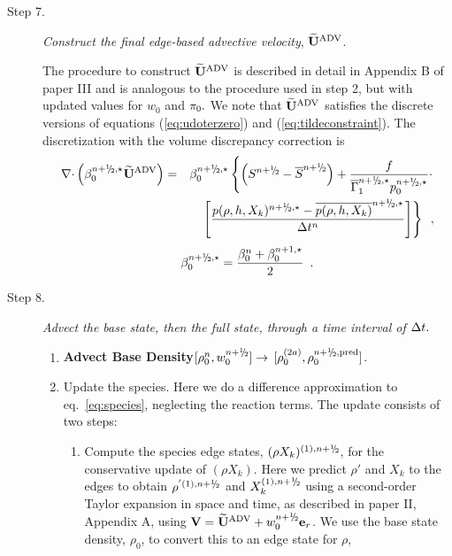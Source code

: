 \begin{description}
\begin{enumerate}
\end{enumerate}

\item[Step 7.] {\em Construct the final edge-based advective velocity}, $\widetilde{\mathbf{U}}^{\mathrm{ADV}}$.

The procedure to construct $\widetilde{\mathbf{U}}^{\mathrm{ADV}}$ is described in detail in Appendix B of paper III
and is analogous to the procedure used in step 2, but with updated values
for $w_0$ and $\pi_0.$  We note that $\widetilde{\mathbf{U}}^{\mathrm{ADV}}$ satisfies the discrete versions of 
equations (\ref{eq:udoterzero}) and (\ref{eq:tildeconstraint}).   The discretization
with the volume discrepancy correction is
\begin{eqnarray}
\nablab \cdotb \left(\beta_0^{\nph,\star} \uadvtwo\right) &=&
\beta_0^{\nph,\star}\left\{\left(S^{\nph} - \overline{S}^{\nph}\right)
 + \frac{f}{\gammabar^{\nph,\star} p_0^{\nph,\star}}\cdot \right. \nonumber \\
&& \left.\left[\frac{p(\rho,h,X_k)^{\nph,\star} - \overline{p(\rho,h,X_k)}^{\nph,\star}}{\Delta t^n}\right]\right\} \enskip ,
\end{eqnarray}
\begin{equation}
\beta_0^{\nph,\star} = \frac{ \beta_0^n +  \beta_0^{n+1,\star} }{2} \enskip .
\end{equation}

\item[Step 8.] {\em Advect the base state, then the full state, through a time interval of $\Delta t.$}

\begin{enumerate}
\renewcommand{\theenumi}{{\bf \alph{enumi}}}

\item {\bf Advect Base Density}$[\rho_0^{n},w_0^{\nph}] \rightarrow$ 
$[\rho_0^{(2a)}, \rho_0^{\nph,{\rm pred}}]$.

\item Update the species.  Here we do a difference approximation to
  eq.~\ref{eq:species}, neglecting the reaction terms.  The
  update consists of two steps:

  \begin{enumerate}
  \renewcommand{\labelenumii}{{\bf \roman{enumii}}.}

  \item Compute the species edge states, $(\rho X_k)^{(1),\nph}$, for
    the conservative update of $(\rho X_k)$.  Here we predict $\rho'$ 
    and $X_k$ to the edges to obtain $\rho^{'(1),\nph}$ and 
    $X_k^{(1),\nph}$ using a second-order Taylor expansion in
    space and time, as described in paper II, Appendix A, using $\Vb =
    \uadvtwo+w_0^{\nph} \er$.  We use the base
    state density, $\rho_0$, to convert this to an edge state for $\rho$,


\end{enumerate}
\end{enumerate}
\end{description}
